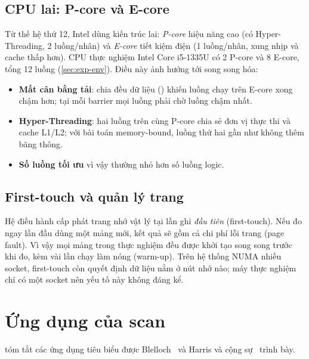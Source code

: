 \subsection{CPU lai: P-core và E-core}

Từ thế hệ thứ 12, Intel dùng kiến trúc lai: \emph{P-core} hiệu năng cao (có Hyper-Threading,
2 luồng/nhân) và \emph{E-core} tiết kiệm điện (1 luồng/nhân, xung nhịp và cache thấp hơn).
CPU thực nghiệm Intel Core i5-1335U có 2 P-core và 8 E-core, tổng 12 luồng
(\cref{sec:exp-env}). Điều này ảnh hưởng tới song song hóa:
\begin{itemize}
  \item \textbf{Mất cân bằng tải}: chia đều dữ liệu () khiến luồng chạy
        trên E-core xong chậm hơn; tại mỗi barrier mọi luồng phải chờ luồng chậm nhất.
  \item \textbf{Hyper-Threading}: hai luồng trên cùng P-core chia sẻ đơn vị thực thi và cache
        L1/L2; với bài toán memory-bound, luồng thứ hai gần như không thêm băng thông.
  \item \textbf{Số luồng tối ưu} vì vậy thường nhỏ hơn số luồng logic.
\end{itemize}

\subsection{First-touch và quản lý trang}

Hệ điều hành cấp phát trang nhớ vật lý tại lần ghi \emph{đầu tiên} (first-touch). Nếu đo ngay
lần đầu dùng một mảng mới, kết quả sẽ gồm cả chi phí lỗi trang (page fault). Vì vậy mọi mảng
trong thực nghiệm đều được khởi tạo song song trước khi đo, kèm vài lần chạy làm nóng (warm-up).
Trên hệ thống NUMA nhiều socket, first-touch còn quyết định dữ liệu nằm ở nút nhớ nào; máy thực
nghiệm chỉ có một socket nên yếu tố này không đáng kể.

\section{Ứng dụng của scan}
\label{sec:applications}

 tóm tắt các ứng dụng tiêu biểu được Blelloch~\cite{blelloch1990} và Harris và
cộng sự~\cite{harris2007} trình bày.

